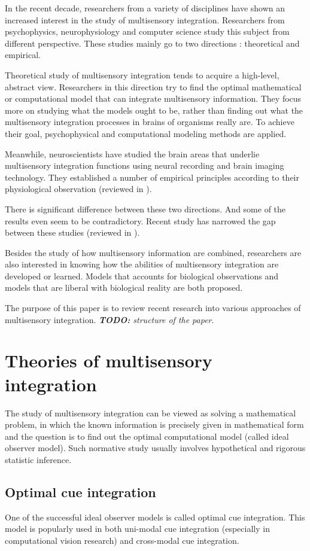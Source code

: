 \documentclass[12pt,twoside]{article}
\theoremstyle{plain}
\theoremstyle{definition}
\theoremstyle{remark}
\newcommand{\TODO}[1]{\emph{\small{{\bf TODO: } #1}}}
\begin{document}
In the recent decade, researchers from a variety of disciplines have shown an increased interest in the study of multisensory integration.
Researchers from psychophysics, neurophysiology and computer science study this subject from different perspective.
These studies mainly go to two directions : theoretical and empirical.

Theoretical study of multisensory integration tends to acquire a high-level, abstract view. Researchers in this direction try to find the optimal mathematical or computational model that can integrate multisensory information. They focus more on studying what the models ought to be, rather than finding out what the multisensory integration processes in brains of organisms really are.
To achieve their goal, psychophysical and computational modeling methods are applied.

Meanwhile, neuroscientists have studied the brain areas that underlie multisensory integration functions using neural recording and brain imaging technology. They established a number of empirical principles according to their physiological observation (reviewed in \cite{stein_multisensory_2008}).

There is significant difference between these two directions. And some of the results even seem to be contradictory. Recent study has narrowed the gap between these studies (reviewed in \cite{fetsch_bridging_2013}).

Besides the study of how multisensory information are combined, researchers are also interested in knowing how the abilities of multisensory integration are developed or learned. Models that accounts for biological observations and models that are liberal with biological reality are both proposed.

The purpose of this paper is to review recent research into various approaches of multisensory integration.
\TODO{structure of the paper}.

\section{Theories of multisensory integration}
The study of multisensory integration can be viewed as solving a mathematical problem, in which the known information is precisely given in mathematical form and the question is to find out the optimal computational model (called ideal observer model). Such normative study usually involves hypothetical and rigorous statistic inference.

\subsection{Optimal cue integration}
One of the successful ideal observer models is called optimal cue integration\cite{geisler_contributions_2011}. This model is popularly used in both uni-modal cue integration (especially in computational vision research) and cross-modal cue integration.
\end{document}
